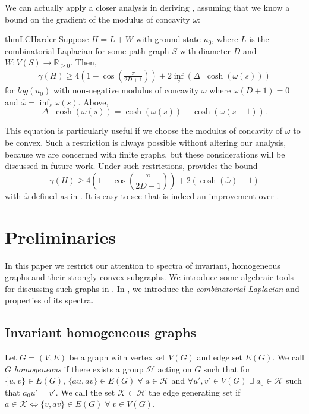 We can actually apply a closer analysis in deriving , assuming that we know a bound on the gradient of the modulus of concavity $\omega$:
\begin{restatable}{thm}{LCHarder}\label{thm:LCbound2}
	Suppose $H = L + W$ with ground state $u_0$, where $L$ is the combinatorial Laplacian for some path graph $S$ with diameter $D$ and $W:V(S)\longrightarrow \mathbb{R}_{\geq 0}$. Then,
	\begin{align*}
		\gamma(H) \geq 4\left(1-\cos\left(\frac{\pi}{2 D + 1}\right)\right) + 2\inf_s\left(\Delta^- \cosh(\omega(s))\right)
	\end{align*}	
	for $log(u_0)$ with non-negative modulus of concavity $\omega$ where $\omega(D+1)=0$ and $\overline{\omega}=\inf_s \omega(s)$. Above,
	\begin{equation*}
		\Delta^- \cosh(\omega(s)) =  \cosh(\omega(s)) - \cosh(\omega(s+1)).
	\end{equation*}
\end{restatable}

This equation is particularly useful if we choose the modulus of concavity of $\omega$ to be convex. Such a restriction is always possible without altering our analysis, because we are concerned with finite graphs, but these considerations will be discussed in future work. Under such restrictions,  provides the bound
\begin{equation}\label{eqn:intro_bound}
	\gamma(H) \geq 4\left(1-\cos\left(\frac{\pi}{2 D + 1}\right)\right) + 2\left(\cosh(\overline{\omega})-1\right)
\end{equation}
with $\overline{\omega}$ defined as in . It is easy to see that  is indeed an improvement over . 

\section{Preliminaries}
In this paper we restrict our attention to spectra of invariant, homogeneous graphs and their strongly convex subgraphs. We introduce some algebraic tools for discussing such graphs in . In , we introduce the \textit{combinatorial Laplacian} and properties of its spectra. 

\subsection{Invariant homogeneous graphs}\label{ssec:IHG}
Let $G = (V,E)$ be a graph with vertex set $V(G)$ and edge set $E(G)$. We call $G$ \textit{homogeneous} if there exists a group $\mathcal{H}$ acting on $G$ such that for $\{u,v\} \in E(G)$, $\{a u , a v\} \in E(G) \; \forall \; a \in \mathcal{H}$ and $\forall u',v' \in V(G)\; \exists \; a_0 \in \mathcal{H}$ such that $a_0 u' = v'$. We call the set $\mathcal{K} \subset \mathcal{H}$ the edge generating set if $a \in \mathcal{K} \iff \{v,av\} \in E(G) \; \forall \; v \in V(G)$. 

